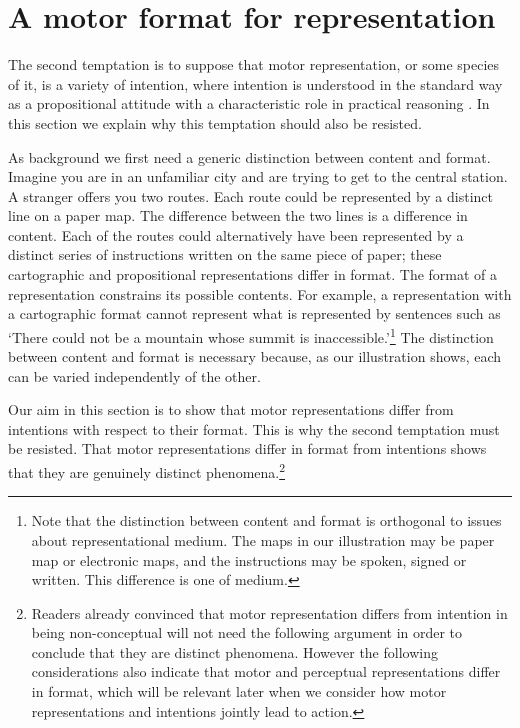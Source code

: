 \documentclass[12pt,\papersize]{extarticle}
\begin{document}
\setlength\footnotesep{1em}


\maketitle
\title{}


\section{A motor format for representation}

The second temptation is to suppose that motor representation, or some species of it, is a variety of intention, where intention is understood in the standard way as a propositional attitude with a characteristic role in practical reasoning \citep{Bratman:1987xw}. In this section we explain why this temptation should also be resisted. 

As background we first need a generic distinction between content and format. Imagine you are in an unfamiliar city and are trying to get to the central station. A stranger offers you two routes. Each route could be represented by a distinct line on a paper map. The difference between the two lines is a difference in content. Each of the routes could alternatively have been represented by a distinct series of instructions written on the same piece of paper; these cartographic and propositional representations differ in format. The format of a representation constrains its possible contents. For example, a representation with a cartographic format cannot represent what is represented by sentences such as `There could not be a mountain whose summit is inaccessible.'\footnote{Note that the distinction between content and format is orthogonal to issues about representational medium. The maps in our illustration may be paper map or electronic maps, and the instructions may be spoken, signed or written. This difference is one of medium.} The distinction between content and format is necessary because, as our illustration shows, each can be varied independently of the other.

Our aim in this section is to show that motor representations differ from intentions with respect to their format. This is why the second temptation must be resisted. That motor representations differ in format from intentions shows that they are genuinely distinct phenomena.\footnote{ Readers already convinced that motor representation differs from intention in being non-conceptual will not need the following argument in order to conclude that they are distinct phenomena. However the following considerations also indicate that motor and perceptual representations differ in format, which will be relevant later when we consider how motor representations and intentions jointly lead to action.}
\end{document}
